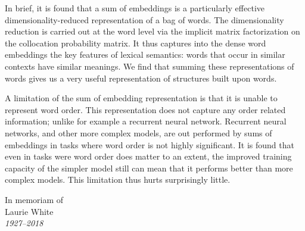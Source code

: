 \documentclass{book}
\begin{document}
In brief, it is found that a sum of embeddings is a particularly effective dimensionality-reduced representation of a bag of words.
The dimensionality reduction is carried out at the word level via the implicit matrix factorization 
on the collocation probability matrix.
It thus captures into the dense word embeddings the key features of lexical semantics:
words that occur in similar contexts have similar meanings.
We find that summing these representations of words gives us a very useful representation of structures built upon words.

A limitation of the sum of embedding representation is that it is unable to represent word order.
This representation does not capture any order related information; unlike for example a recurrent neural network.
Recurrent neural networks, and other more complex models, are out performed by sums of embeddings in tasks where word order is not highly significant.
It is found that even in tasks were word order does matter to an extent, the improved training capacity of the simpler model still can mean that it performs better than more complex models.
This limitation thus hurts surprisingly little.

{%
\clearpage
\thispagestyle{empty}
\centering
	{
	In memoriam of\\
	Laurie White\\
	\emph{1927--2018}\\
	}
\clearpage
}
\end{document}
